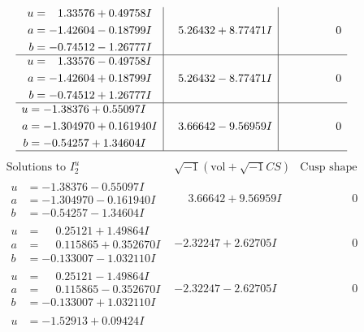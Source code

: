 \documentclass[1p]{elsarticle_modified}
\theoremstyle{definition}
\newcommand{\I}{\sqrt{-1}}
\begin{document}
$$\begin{array}{c|c|c}
\begin{aligned}
u &= \phantom{-}1.33576 + 0.49758 I \\
a &= -1.42604 - 0.18799 I \\
b &= -0.74512 - 1.26777 I\end{aligned}
 & \phantom{-}5.26432 + 8.77471 I & \phantom{-0.000000 } 0 \\ \hline\begin{aligned}
u &= \phantom{-}1.33576 - 0.49758 I \\
a &= -1.42604 + 0.18799 I \\
b &= -0.74512 + 1.26777 I\end{aligned}
 & \phantom{-}5.26432 - 8.77471 I & \phantom{-0.000000 } 0 \\ \hline\begin{aligned}
u &= -1.38376 + 0.55097 I \\
a &= -1.304970 + 0.161940 I \\
b &= -0.54257 + 1.34604 I\end{aligned}
 & \phantom{-}3.66642 - 9.56959 I & \phantom{-0.000000 } 0\\
 \hline 
 \end{array}$$\newpage$$\begin{array}{c|c|c}  
\text{Solutions to }I^u_{2}& \I (\text{vol} + \sqrt{-1}CS) & \text{Cusp shape}\\
 \hline 
\begin{aligned}
u &= -1.38376 - 0.55097 I \\
a &= -1.304970 - 0.161940 I \\
b &= -0.54257 - 1.34604 I\end{aligned}
 & \phantom{-}3.66642 + 9.56959 I & \phantom{-0.000000 } 0 \\ \hline\begin{aligned}
u &= \phantom{-}0.25121 + 1.49864 I \\
a &= \phantom{-}0.115865 + 0.352670 I \\
b &= -0.133007 - 1.032110 I\end{aligned}
 & -2.32247 + 2.62705 I & \phantom{-0.000000 } 0 \\ \hline\begin{aligned}
u &= \phantom{-}0.25121 - 1.49864 I \\
a &= \phantom{-}0.115865 - 0.352670 I \\
b &= -0.133007 + 1.032110 I\end{aligned}
 & -2.32247 - 2.62705 I & \phantom{-0.000000 } 0 \\ \hline\begin{aligned}
u &= -1.52913 + 0.09424 I \\

\end{aligned}
\end{array}$$
\end{document}
